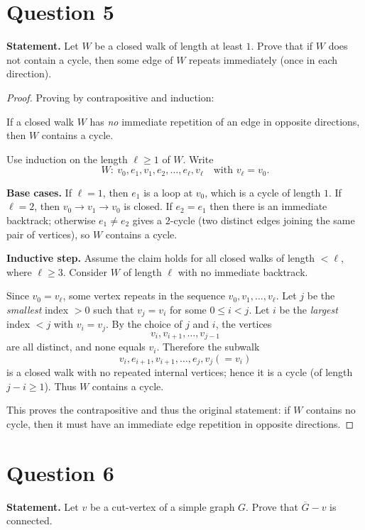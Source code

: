\documentclass[11pt]{article}
\begin{document}
\newpage

\section*{Question 5}
\textbf{Statement.} Let $W$ be a closed walk of length at least $1$. Prove that if $W$ does not contain a cycle, then some edge of $W$ repeats immediately (once in each direction).

\begin{proof}
Proving by contrapositive and induction:

\medskip
\noindent If a closed walk $W$ has \emph{no} immediate repetition of an edge in opposite directions, then $W$ contains a cycle.

\medskip
\noindent Use induction on the length $\ell\ge 1$ of $W$.
Write
\[
W:\ v_0,e_1,v_1,e_2,\dots,e_\ell,v_\ell
\quad\text{with } v_\ell=v_0.
\]

\medskip
\noindent\textbf{Base cases.}
If $\ell=1$, then $e_1$ is a loop at $v_0$, which is a cycle of length $1$.
If $\ell=2$, then $v_0\to v_1\to v_0$ is closed. If $e_2=e_1$ then there is an immediate backtrack; otherwise $e_1\neq e_2$ gives a $2$-cycle (two distinct edges joining the same pair of vertices), so $W$ contains a cycle.

\medskip
\noindent\textbf{Inductive step.}
Assume the claim holds for all closed walks of length $<\ell$, where $\ell\ge 3$.
Consider $W$ of length $\ell$ with no immediate backtrack.

Since $v_0=v_\ell$, some vertex repeats in the sequence $v_0,v_1,\dots,v_\ell$.
Let $j$ be the \emph{smallest} index $>0$ such that $v_j=v_i$ for some $0\le i<j$.
Let $i$ be the \emph{largest} index $<j$ with $v_i=v_j$.
By the choice of $j$ and $i$, the vertices
\[
v_i, v_{i+1},\dots, v_{j-1}
\]
are all distinct, and none equals $v_i$.
Therefore the subwalk
\[
v_i, e_{i+1}, v_{i+1}, \dots, e_j, v_j(=v_i)
\]
is a closed walk with no repeated internal vertices; hence it is a cycle (of length $j-i\ge 1$).
Thus $W$ contains a cycle.

This proves the contrapositive and thus the original statement: if $W$ contains no cycle, then it must have an immediate edge repetition in opposite directions.
\end{proof}

\newpage

\section*{Question 6}
\textbf{Statement.} Let $v$ be a cut-vertex of a simple graph $G$. Prove that $\overline{G}-v$ is connected.
\end{document}
